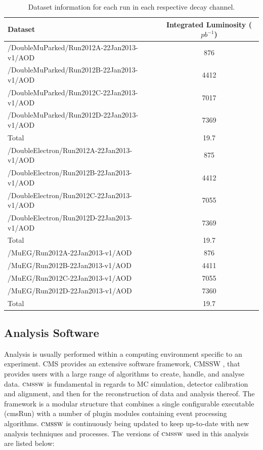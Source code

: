 \begin{table} 
\begin{center}
\begin{tabular}{|l|c|}
\hline
	\textbf{Dataset} & \textbf{Integrated Luminosity ($pb^{-1}$)}\\
\hline
	/DoubleMuParked/Run2012A-22Jan2013-v1/AOD  & 876 \\
	/DoubleMuParked/Run2012B-22Jan2013-v1/AOD  & 4412 \\
	/DoubleMuParked/Run2012C-22Jan2013-v1/AOD  & 7017 \\
	/DoubleMuParked/Run2012D-22Jan2013-v1/AOD  & 7369 \\
\hline
	Total & 19.7\\	
\hline
	/DoubleElectron/Run2012A-22Jan2013-v1/AOD  & 875 \\
	/DoubleElectron/Run2012B-22Jan2013-v1/AOD  & 4412 \\
	/DoubleElectron/Run2012C-22Jan2013-v1/AOD  & 7055 \\
	/DoubleElectron/Run2012D-22Jan2013-v1/AOD  & 7369 \\
\hline
	Total & 19.7\\	
\hline
	/MuEG/Run2012A-22Jan2013-v1/AOD  & 876 \\
	/MuEG/Run2012B-22Jan2013-v1/AOD  & 4411 \\
	/MuEG/Run2012C-22Jan2013-v1/AOD  & 7055 \\
	/MuEG/Run2012D-22Jan2013-v1/AOD  & 7360 \\
\hline
	Total & 19.7\\	
\hline	
\end{tabular}	
\end{center}
\caption{Dataset information for each run in each respective decay channel.}
\label{tab-datasets}
\end{table}

\subsection{Analysis Software} \label{subsec-AnalysisSoftware}

Analysis is usually performed within a computing environment specific to an experiment. CMS provides an extensive software framework, CMSSW \cite{CMSSW}, that provides users with a large range of algorithms to create, handle, and analyse data. ${\textsc{cmssw}}$ is fundamental in regards to MC simulation, detector calibration and alignment, and then for the reconstruction of data and analysis thereof. The framework is a modular structure that combines a single configurable executable (cmsRun) with a number of plugin modules containing event processing algorithms. ${\textsc{cmssw}}$ is continuously being updated to keep up-to-date with new analysis techniques and processes. The versions of ${\textsc{cmssw}}$ used in this analysis are listed below:

